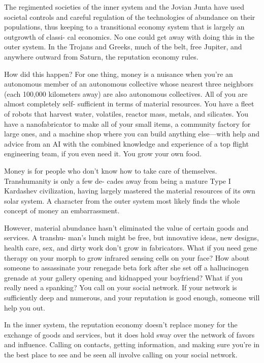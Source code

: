 The regimented societies of the inner system and the Jovian 
Junta have used societal controls and careful regulation of the 
technologies of abundance on their populations, thus keeping to a 
transitional economy system that is largely an outgrowth of classi-
cal economics. No one could get away with doing this in the outer 
system. In the Trojans and Greeks, much of the belt, free Jupiter, and 
anywhere outward from Saturn, the reputation economy rules.

How did this happen? For one thing, money is a nuisance when 
you're an autonomous member of an autonomous collective whose 
nearest three neighbors (each 100,000 kilometers away) are also 
autonomous collectives. All of you are almost completely self-
sufficient in terms of material resources. You have a fleet of robots 
that harvest water, volatiles, reactor mass, metals, and silicates. You 
have a nanofabricator to make all of your small items, a community 
factory for large ones, and a machine shop where you can build 
anything else—with help and advice from an AI with the combined 
knowledge and experience of a top flight engineering team, if you 
even need it. You grow your own food.

Money is for people who don't know how to take 
care of themselves. Transhumanity is only a few de-
cades away from being a mature Type I Kardashev 
civilization, having largely mastered the material 
resources of its own solar system. A character from 
the outer system most likely finds the whole concept 
of money an embarrassment.

However, material abundance hasn't eliminated 
the value of certain goods and services. A transhu-
man's lunch might be free, but innovative ideas, new 
designs, health care, sex, and dirty work don't grow 
in fabricators. What if you need gene therapy on your 
morph to grow infrared sensing cells on your face? 
How about someone to assassinate your renegade 
beta fork after she set off a hallucinogen grenade at 
your gallery opening and kidnapped your boyfriend? 
What if you really need a spanking? You call on your 
social network. If your network is sufficiently deep 
and numerous, and your reputation is good enough, 
someone will help you out.

In the inner system, the reputation economy doesn't 
replace money for the exchange of goods and services, 
but it does hold sway over the network of favors and 
influence. Calling on contacts, getting information, 
and making sure you're in the best place to see and be 
seen all involve calling on your social network.

